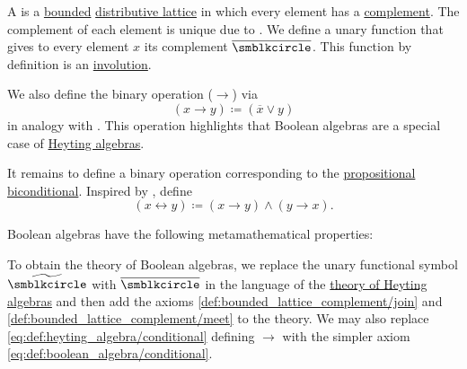 \begin{definition}\label{def:boolean_algebra}
  A  is a \hyperref[def:semilattice/bounded]{bounded} \hyperref[def:semilattice/distributive_lattice]{distributive lattice} in which every element has a \hyperref[def:bounded_lattice_complement]{complement}. The complement of each element is unique due to . We define a unary function that gives to every element \( x \) its complement \( \overline \anon \). This function by definition is an \hyperref[def:set_with_involution]{involution}.

  \begin{thmenum}[series=def:boolean_algebra]
     We also define the binary operation  (\( \rightarrow \)) via
    \begin{equation}\label{eq:def:boolean_algebra/conditional}
      (x \rightarrow y) \coloneqq (\overline x \vee y)
    \end{equation}
    in analogy with . This operation highlights that Boolean algebras are a special case of \hyperref[thm:boolean_algebras_are_heyting_algebras]{Heyting algebras}.

     It remains to define a binary operation corresponding to the \hyperref[def:propositional_language/connectives/biconditional]{propositional biconditional}. Inspired by , define
    \begin{equation}\label{eq:def:boolean_algebra/biconditional}
      (x \leftrightarrow y) \coloneqq (x \rightarrow y) \wedge (y \rightarrow x).
    \end{equation}
  \end{thmenum}

  Boolean algebras have the following metamathematical properties:
  \begin{thmenum}[resume=def:boolean_algebra]
     To obtain the theory of Boolean algebras, we replace the unary functional symbol \( \widetilde{\anon} \) with \( \overline \anon \) in the language of the \hyperref[def:heyting_algebra/theory]{theory of Heyting algebras} and then add the axioms \eqref{def:bounded_lattice_complement/join} and \eqref{def:bounded_lattice_complement/meet} to the theory. We may also replace \eqref{eq:def:heyting_algebra/conditional} defining \( \rightarrow \) with the simpler axiom \eqref{eq:def:boolean_algebra/conditional}.


\end{thmenum}
\end{definition}
